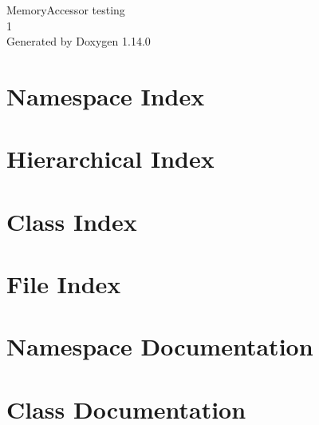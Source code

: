 \documentclass[twoside]{book}
\newcommand{\+}{\discretionary{\mbox{\scriptsize$\hookleftarrow$}}{}{}}
\newcommand{\clearemptydoublepage}{%
    \newpage{\pagestyle{empty}\cleardoublepage}%
  }
\begin{document}
  \raggedbottom
    \hypersetup{pageanchor=false,
                bookmarksnumbered=true,
                pdfencoding=unicode
               }
  \begin{titlepage}
  \vspace*{7cm}
  \begin{center}%
  {\Large Memory\+Accessor testing}\\
  [1ex]\large 1 \\
  \vspace*{1cm}
  {\large Generated by Doxygen 1.14.0}\\
  \end{center}
  \end{titlepage}
  \clearemptydoublepage
  \tableofcontents
  \clearemptydoublepage
  \hypersetup{pageanchor=true}
\chapter{Namespace Index}

\chapter{Hierarchical Index}

\chapter{Class Index}

\chapter{File Index}

\chapter{Namespace Documentation}






\chapter{Class Documentation}



















\end{document}
